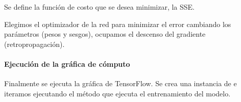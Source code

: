 Se define la función de costo que se desea minimizar, la SSE.

\begin{sphinxVerbatim}[commandchars=\\\{\}]
    
\end{sphinxVerbatim}

Elegimos el optimizador de la red para minimizar el error cambiando los parámetros (pesos y sesgos), ocupamos el descenso del gradiente (retropropagación).

\begin{sphinxVerbatim}[commandchars=\\\{\}]
  
  
\end{sphinxVerbatim}

\paragraph{Ejecución de la gráfica de cómputo}

Finalmente se ejecuta la gráfica de TensorFlow. Se crea una instancia de  e iteramos ejecutando el método 
que ejecuta el entrenamiento del modelo.




